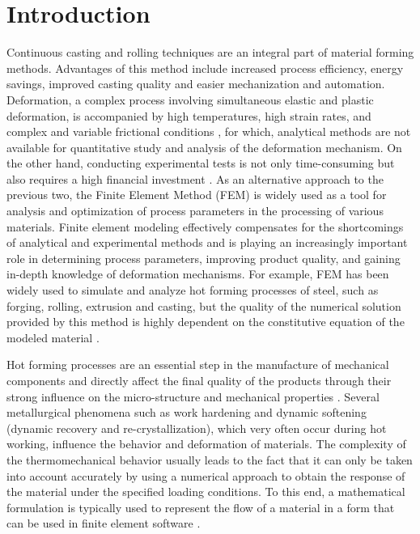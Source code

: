 \documentclass[twoside,english,1p,final,sort&compress]{elsarticle}
\theoremstyle{plain}
\begin{document}
\section{Introduction\label{sec:Introduction}}
Continuous casting and rolling techniques are an integral part of material forming methods. Advantages of this method include increased process efficiency, energy savings, improved casting quality and easier mechanization and automation. Deformation, a complex process involving simultaneous elastic and plastic deformation, is accompanied by high temperatures, high strain rates, and complex and variable frictional conditions \cite{He-2013}, for which, analytical methods are not available for quantitative study and analysis of the deformation mechanism. On the other hand, conducting experimental tests is not only time-consuming but also requires a high financial investment \cite{Changizian-2012}. As an alternative approach to the previous two, the Finite Element Method (FEM) is widely used as a tool for analysis and optimization of process parameters in the processing of various materials. Finite element modeling effectively compensates for the shortcomings of analytical and experimental methods and is playing an increasingly important role in determining process parameters, improving product quality, and gaining in-depth knowledge of deformation mechanisms. For example, FEM has been widely used to simulate and analyze hot forming processes of steel, such as forging, rolling, extrusion and casting, but the quality of the numerical solution provided by this method is highly dependent on the constitutive equation of the modeled material \cite{Qin-2010, Mandal-2009, Ji-2018}.

Hot forming processes are an essential step in the manufacture of mechanical components and directly affect the final quality of the products through their strong influence on the micro-structure and mechanical properties \cite{Ashtiani-2012}. Several metallurgical phenomena such as work hardening and dynamic softening (dynamic recovery and re-crystallization), which very often occur during hot working, influence the behavior and deformation of materials. The complexity of the thermomechanical behavior usually leads to the fact that it can only be taken into account accurately by using a numerical approach to obtain the response of the material under the specified loading conditions. To this end, a mathematical formulation is typically used to represent the flow of a material in a form that can be used in finite element software \cite{Lin-2008-P, Wu-2012}.
\end{document}
